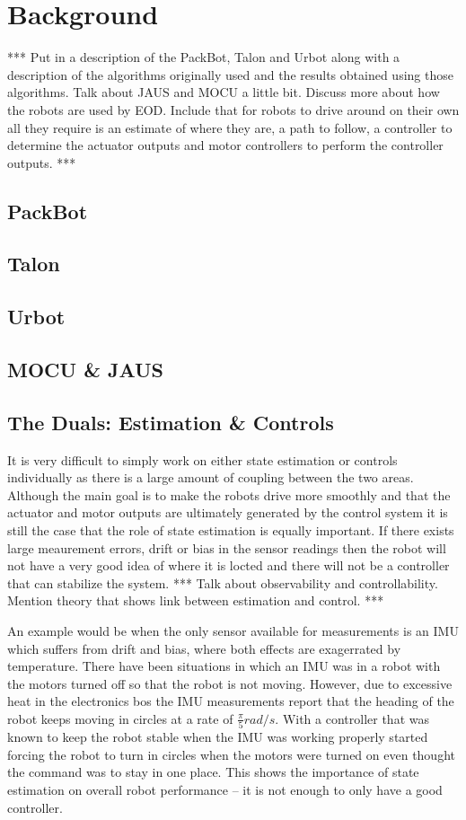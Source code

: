 \chapter{Background}
\label{ch:background}
*** Put in a description of the PackBot, Talon and Urbot along with a description of the algorithms originally used and the results obtained using those algorithms. Talk about JAUS and MOCU a little bit. Discuss more about how the robots are used by EOD. Include that for robots to drive around on their own all they require is an estimate of where they are, a path to follow, a controller to determine the actuator outputs and motor controllers to perform the controller outputs. ***

\section{PackBot}

\section{Talon}

\section{Urbot}

\section{MOCU \& JAUS}

\section{The Duals: Estimation \& Controls}
It is very difficult to simply work on either state estimation or controls individually as there is a large amount of coupling between the two areas. Although the main goal is to make the robots drive more smoothly and that the actuator and motor outputs are ultimately generated by the control system it is still the case that the role of state estimation is equally important. If there exists large meaurement errors, drift or bias in the sensor readings then the robot will not have a very good idea of where it is locted and there will not be a controller that can stabilize the system. *** Talk about observability and controllability. Mention theory that shows link between estimation and control. ***

An example would be when the only sensor available for measurements is an IMU which suffers from drift and bias, where both effects are exagerrated by temperature. There have been situations in which an IMU was in a robot with the motors turned off so that the robot is not moving. However, due to excessive heat in the electronics bos the IMU measurements report that the heading of the robot keeps moving in circles at a rate of $\frac{\pi}{5} rad/s$. With a controller that was known to keep the robot stable when the IMU was working properly started forcing the robot to turn in circles when the motors were turned on even thought the command was to stay in one place. This shows the importance of state estimation on overall robot performance -- it is not enough to only have a good controller.